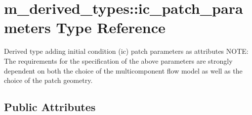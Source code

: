 \hypertarget{structm__derived__types_1_1ic__patch__parameters}{}\section{m\+\_\+derived\+\_\+types\+:\+:ic\+\_\+patch\+\_\+parameters Type Reference}
\label{structm__derived__types_1_1ic__patch__parameters}


Derived type adding initial condition (ic) patch parameters as attributes N\+O\+TE\+: The requirements for the specification of the above parameters are strongly dependent on both the choice of the multicomponent flow model as well as the choice of the patch geometry.  


\subsection*{Public Attributes}
